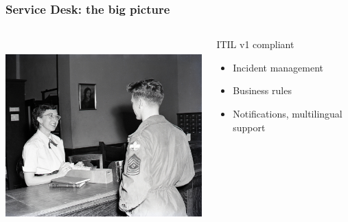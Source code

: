 \documentclass{beamer}
\begin{document}
\begin{frame}


    \frametitle{Service Desk: the big picture}
 \begin{columns}
 \begin{column}{0.45\textwidth}
         \includegraphics[height=7.5cm]{./pics/servicedesk.jpg}
 \end{column}
 \begin{column}{0.45\textwidth}
    \begin{block}{ITIL v1 compliant}
        \begin{itemize}
            \item Incident management
            \item Business rules
            \item Notifications, multilingual support
        \end{itemize}

    \end{block}
   
 \end{column}
\end{columns}
\end{frame}
\end{document}
